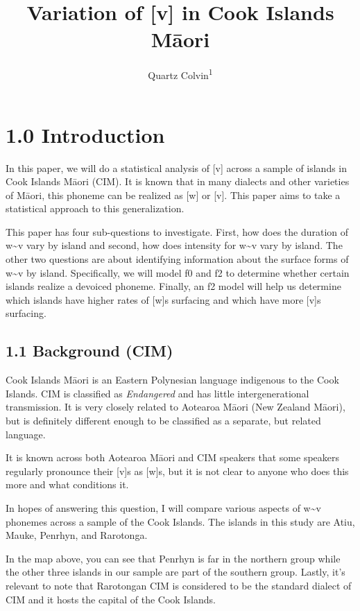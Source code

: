 \documentclass[
  ,man,floatsintext]{apa6}
\title{Variation of {[}v{]} in Cook Islands Māori}
\author{Quartz Colvin\textsuperscript{1}}
\date{}
\affiliation{\vspace{0.5cm}\textsuperscript{1} Rutgers University}
\begin{document}
\maketitle

\section{1.0 Introduction}\label{introduction}

In this paper, we will do a statistical analysis of {[}v{]} across a sample of islands in Cook Islands Māori (CIM). It is known that in many dialects and other varieties of Māori, this phoneme can be realized as {[}w{]} or {[}v{]}. This paper aims to take a statistical approach to this generalization.

This paper has four sub-questions to investigate. First, how does the duration of w\textasciitilde v vary by island and second, how does intensity for w\textasciitilde v vary by island. The other two questions are about identifying information about the surface forms of w\textasciitilde v by island. Specifically, we will model f0 and f2 to determine whether certain islands realize a devoiced phoneme. Finally, an f2 model will help us determine which islands have higher rates of {[}w{]}s surfacing and which have more {[}v{]}s surfacing.

\subsection{1.1 Background (CIM)}\label{background-cim}

Cook Islands Māori is an Eastern Polynesian language indigenous to the Cook Islands. CIM is classified as \emph{Endangered} and has little intergenerational transmission. It is very closely related to Aotearoa Māori (New Zealand Māori), but is definitely different enough to be classified as a separate, but related language.

It is known across both Aotearoa Māori and CIM speakers that some speakers regularly pronounce their {[}v{]}s as {[}w{]}s, but it is not clear to anyone who does this more and what conditions it.

In hopes of answering this question, I will compare various aspects of w\textasciitilde v phonemes across a sample of the Cook Islands. The islands in this study are Atiu, Mauke, Penrhyn, and Rarotonga.

In the map above, you can see that Penrhyn is far in the northern group while the other three islands in our sample are part of the southern group. Lastly, it's relevant to note that Rarotongan CIM is considered to be the standard dialect of CIM and it hosts the capital of the Cook Islands.
\end{document}
